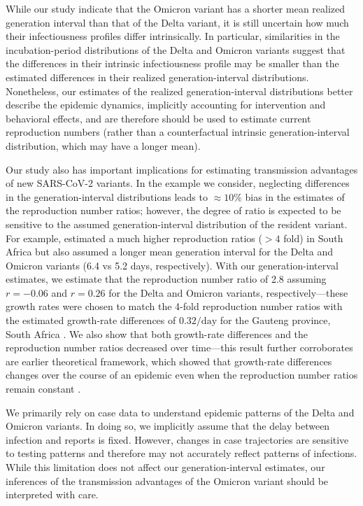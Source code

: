 \documentclass[12pt]{article}
\begin{document}
While our study indicate that the Omicron variant has a shorter mean realized generation interval than that of the Delta variant, it is still uncertain how much their infectiousness profiles differ intrinsically.
In particular, similarities in the incubation-period distributions of the Delta and Omicron variants suggest that the differences in their intrinsic infectiousness profile may be smaller than the estimated differences in their realized generation-interval distributions.
Nonetheless, our estimates of the realized generation-interval distributions better describe the epidemic dynamics, implicitly accounting for intervention and behavioral effects, and are therefore should be used to estimate current reproduction numbers (rather than a counterfactual intrinsic generation-interval distribution, which may have a longer mean).

Our study also has important implications for estimating transmission advantages of new SARS-CoV-2 variants.
In the example we consider, neglecting differences in the generation-interval distributions leads to $\approx 10\%$ bias in the estimates of the reproduction number ratios; however, the degree of ratio is expected to be sensitive to the assumed generation-interval distribution of the resident variant.
For example, \cite{pearson2021bounding} estimated a much higher reproduction ratios ($> 4$ fold) in South Africa but also assumed a longer mean generation interval for the Delta and Omicron variants (6.4 vs 5.2 days, respectively).
With our generation-interval estimates, we estimate that the reproduction number ratio of 2.8 assuming $r=-0.06$ and $r=0.26$ for the Delta and Omicron variants, respectively---these growth rates were chosen to match the 4-fold reproduction number ratios with the estimated growth-rate differences of $0.32/\mathrm{day}$ for the Gauteng province, South Africa \cite{pearson2021bounding}.
We also show that both growth-rate differences and the reproduction number ratios decreased over time---this result further corroborates are earlier theoretical framework, which showed that growth-rate differences changes over the course of an epidemic even when the reproduction number ratios remain constant \citep{park2021roles}.

We primarily rely on case data to understand epidemic patterns of the Delta and Omicron variants.
In doing so, we implicitly assume that the delay between infection and reports is fixed.
However, changes in case trajectories are sensitive to testing patterns and therefore may not accurately reflect patterns of infections.
While this limitation does not affect our generation-interval estimates, our inferences of the transmission advantages of the Omicron variant should be interpreted with care.
\end{document}
